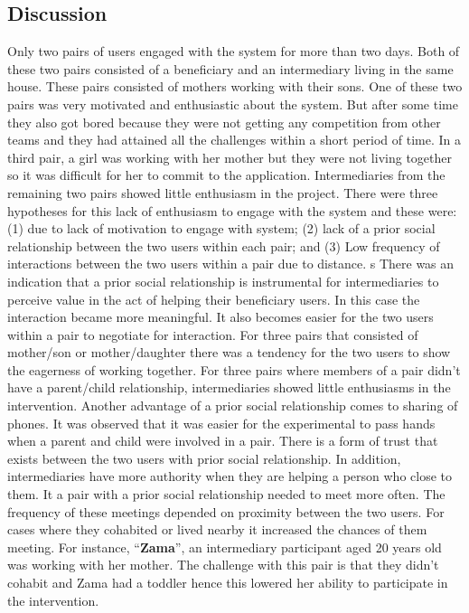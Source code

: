 \subsection{Discussion}
Only two pairs of users engaged with the system for more than two days. Both of these two pairs consisted of a beneficiary and an  intermediary living in the same house. These pairs consisted of mothers working with their sons. One of these two pairs was very motivated and enthusiastic about the system. But after some time they also got bored because they were not getting any competition from other teams and they had attained all the challenges within a short period of time. In a third pair, a girl was working with her mother but they were not living together so it was difficult for her to commit to the application. Intermediaries from the remaining two pairs showed little enthusiasm in the project. There were three hypotheses for this lack of enthusiasm to engage with the system and these were: (1) due to lack of motivation to engage with system; (2) lack of a prior social relationship between the two users within each pair; and (3) Low frequency of interactions between the two users within a pair due to distance.
s
There was an indication that a prior social relationship is instrumental for intermediaries to perceive value in the act of helping their beneficiary users. In this case the interaction became more meaningful. It also becomes easier for the two users within a pair to negotiate for interaction. For three pairs that consisted of mother/son or mother/daughter there was a tendency for the two users to show the eagerness of working together. For three pairs where members of a pair didn't  have a parent/child relationship, intermediaries showed little enthusiasms in the intervention. Another advantage of a prior social relationship comes to sharing of phones. It was observed that it was easier for the experimental to pass hands when a parent and child were involved in a pair. There is a form of trust that exists between the two users with prior social relationship. In addition, intermediaries have more authority when they are helping a person who close to them. It a pair with a prior social relationship needed to meet more often. The frequency of these meetings depended on proximity between the two users. For cases where they cohabited or lived nearby it increased the chances of them meeting. For instance, ``\textbf{Zama}'', an intermediary participant aged 20 years old was working with her mother. The challenge with this pair is that they didn't cohabit and Zama had a toddler hence this lowered her ability to participate in the intervention.  

